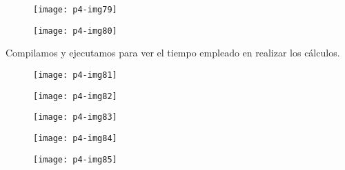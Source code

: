 \documentclass[10pt]{article}
\begin{document}
\begin{figure}[H]
	\begin{center}
 		\texttt{[image: p4-img79]}
	\end{center} 
\end{figure}

\begin{figure}[H]
	\begin{center}
 		\texttt{[image: p4-img80]}
	\end{center} 
\end{figure}

Compilamos y ejecutamos para ver el tiempo empleado en realizar los cálculos. \\

\begin{figure}[H]
	\begin{center}
 		\texttt{[image: p4-img81]}
	\end{center} 
\end{figure}

\begin{figure}[H]
	\begin{center}
 		\texttt{[image: p4-img82]}
	\end{center} 
\end{figure}

\begin{figure}[H]
	\begin{center}
 		\texttt{[image: p4-img83]}
	\end{center} 
\end{figure}

\begin{figure}[H]
	\begin{center}
 		\texttt{[image: p4-img84]}
	\end{center} 
\end{figure}

\begin{figure}[H]
	\begin{center}
 		\texttt{[image: p4-img85]}
	\end{center} 
\end{figure}
\end{document}
